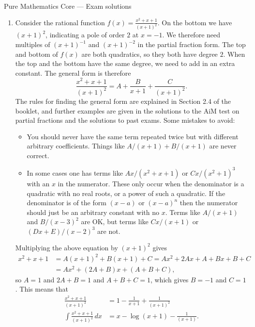 \documentclass{amsart}
\renewcommand{\:}       {\colon}
\newcommand{\mks}[1]    {}
\newcommand{\mk}        {}
\begin{document}
\begin{center}
{\Large Pure Mathematics Core --- Exam solutions}
\end{center}

\renewcommand{\theenumi}{A\arabic{enumi}}

\begin{enumerate}
 \item %
  Consider the rational function $f(x)=\frac{x^2+x+1}{(x+1)^2}$.  On
  the bottom we have $(x+1)^2$, indicating a pole of order $2$ at
  $x=-1$.  We therefore need multiples of $(x+1)^{-1}$ and
  $(x+1)^{-2}$ in the partial fraction form.  The top and bottom of
  $f(x)$ are both quadratics, so they both have degree $2$.  When the
  top and the bottom have the same degree, we need to add in an extra
  constant.   The general form is therefore 
  \[ \frac{x^2+x+1}{(x+1)^2} =
      A + \frac{B}{x+1} + \frac{C}{(x+1)^2}.\mks{2}
  \]
  The rules for finding the general form are explained in Section 2.4
  of the booklet, and further examples are given in the solutions to
  the AiM test on partial fractions and the solutions to past exams.
  Some mistakes to avoid:
  \begin{itemize}
   \item You should never have the same term repeated twice but with
    different arbitrary coefficients.  Things like $A/(x+1)+B/(x+1)$
    are never correct.
   \item In some cases one has terms like $Ax/(x^2+x+1)$ or
    $Cx/(x^2+1)^3$ with an $x$ in the numerator.  These only occur
    when the denominator is a quadratic with no real roots, or a power
    of such a quadratic.  If the denominator is of the form $(x-a)$ or
    $(x-a)^n$ then the numerator should just be an arbitrary constant
    with no $x$.  Terms like $A/(x+1)$ and $B/(x-3)^2$ are OK, but
    terms like $Cx/(x+1)$ or $(Dx+E)/(x-2)^3$ are not.
  \end{itemize}

  Multiplying the above equation by $(x+1)^2$ gives
  \begin{align*}
   x^2+x+1 &= A(x+1)^2 + B(x+1) + C  = Ax^2 +2Ax + A + Bx + B + C \\
           &= Ax^2 + (2A+B)x + (A+B+C), \mk
  \end{align*}
  so $A=1$ and $2A+B=1$ and $A+B+C=1$, which gives $B=-1$ and $C=1$. \mk
  This means that
  \begin{align*}
   \frac{x^2+x+1}{(x+1)^2} &= 1 - \frac{1}{x+1} + \frac{1}{(x+1)^2} \\
   \int \frac{x^2+x+1}{(x+1)^2}\,dx &= x - \log(x+1) - \frac{1}{(x+1)}.\mks{2}
  \end{align*}


\end{enumerate}
\end{document}
